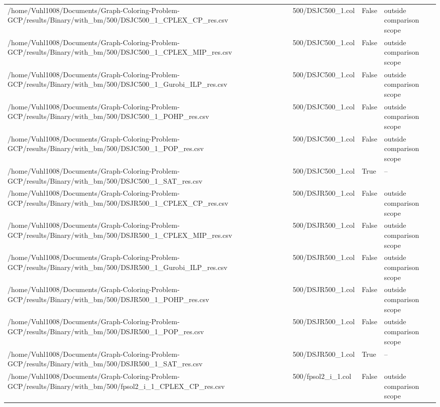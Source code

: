 \begin{table}[htbp]
\begin{tabular}{llll}
/home/Vuhl1008/Documents/Graph-Coloring-Problem-GCP/results/Binary/with\_bm/500/DSJC500\_1\_CPLEX\_CP\_res.csv & 500/DSJC500\_1.col & False & outside comparison scope \\
/home/Vuhl1008/Documents/Graph-Coloring-Problem-GCP/results/Binary/with\_bm/500/DSJC500\_1\_CPLEX\_MIP\_res.csv & 500/DSJC500\_1.col & False & outside comparison scope \\
/home/Vuhl1008/Documents/Graph-Coloring-Problem-GCP/results/Binary/with\_bm/500/DSJC500\_1\_Gurobi\_ILP\_res.csv & 500/DSJC500\_1.col & False & outside comparison scope \\
/home/Vuhl1008/Documents/Graph-Coloring-Problem-GCP/results/Binary/with\_bm/500/DSJC500\_1\_POHP\_res.csv & 500/DSJC500\_1.col & False & outside comparison scope \\
/home/Vuhl1008/Documents/Graph-Coloring-Problem-GCP/results/Binary/with\_bm/500/DSJC500\_1\_POP\_res.csv & 500/DSJC500\_1.col & False & outside comparison scope \\
/home/Vuhl1008/Documents/Graph-Coloring-Problem-GCP/results/Binary/with\_bm/500/DSJC500\_1\_SAT\_res.csv & 500/DSJC500\_1.col & True & -- \\
/home/Vuhl1008/Documents/Graph-Coloring-Problem-GCP/results/Binary/with\_bm/500/DSJR500\_1\_CPLEX\_CP\_res.csv & 500/DSJR500\_1.col & False & outside comparison scope \\
/home/Vuhl1008/Documents/Graph-Coloring-Problem-GCP/results/Binary/with\_bm/500/DSJR500\_1\_CPLEX\_MIP\_res.csv & 500/DSJR500\_1.col & False & outside comparison scope \\
/home/Vuhl1008/Documents/Graph-Coloring-Problem-GCP/results/Binary/with\_bm/500/DSJR500\_1\_Gurobi\_ILP\_res.csv & 500/DSJR500\_1.col & False & outside comparison scope \\
/home/Vuhl1008/Documents/Graph-Coloring-Problem-GCP/results/Binary/with\_bm/500/DSJR500\_1\_POHP\_res.csv & 500/DSJR500\_1.col & False & outside comparison scope \\
/home/Vuhl1008/Documents/Graph-Coloring-Problem-GCP/results/Binary/with\_bm/500/DSJR500\_1\_POP\_res.csv & 500/DSJR500\_1.col & False & outside comparison scope \\
/home/Vuhl1008/Documents/Graph-Coloring-Problem-GCP/results/Binary/with\_bm/500/DSJR500\_1\_SAT\_res.csv & 500/DSJR500\_1.col & True & -- \\
/home/Vuhl1008/Documents/Graph-Coloring-Problem-GCP/results/Binary/with\_bm/500/fpsol2\_i\_1\_CPLEX\_CP\_res.csv & 500/fpsol2\_i\_1.col & False & outside comparison scope \\

\end{tabular}
\end{table}
